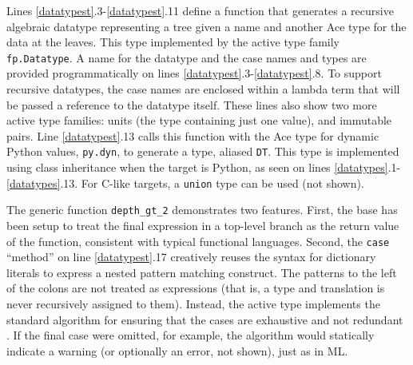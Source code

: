 Lines \ref{datatypest}.3-\ref{datatypest}.11 define a function that generates a recursive algebraic datatype representing a tree given a name and another Ace type for the data at the leaves. This type implemented by the active type family \verb|fp.Datatype|. A name for the datatype and the case names and types are provided programmatically on lines \ref{datatypest}.3-\ref{datatypest}.8. To support recursive datatypes, the case names are enclosed within a lambda term that will be passed a reference to the datatype itself. These lines also show two more active type families: units (the type containing just one value), and immutable pairs. Line \ref{datatypest}.13 calls this function with the Ace type for dynamic Python values, \verb|py.dyn|, to generate a type, aliased \verb|DT|. This type is implemented using class inheritance when the target is Python, as seen on lines \ref{datatypes}.1-\ref{datatypes}.13. For C-like targets, a \verb|union| type can be used (not shown).

The generic function \verb|depth_gt_2| demonstrates two features. First, the base has been setup to treat the final expression in a top-level branch as the return value of the function, consistent with typical functional languages. Second, the \verb|case| ``method'' on line \ref{datatypest}.17 creatively reuses the syntax for dictionary literals to express a nested pattern matching construct. The patterns to the left of the colons are not treated as expressions (that is, a type and translation is never recursively assigned to them). Instead, the active type implements the standard algorithm for ensuring that the cases are exhaustive and not redundant \cite{pfpl}. If the final case were omitted, for example, the algorithm would statically indicate a warning (or optionally an error, not shown), just as in ML.


%
%

